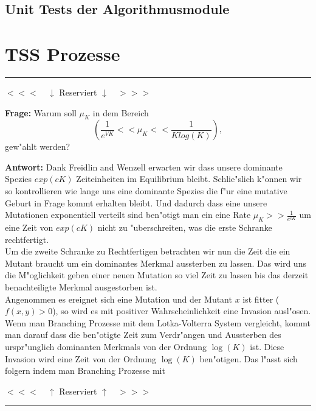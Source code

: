 \documentclass[11pt, a4paper, german]{article}
\begin{document}
	\subsection{Unit Tests der Algorithmusmodule}

\clearpage
\section{TSS Prozesse}
\noindent\rule{\textwidth}{2pt}
\begin{center}
	$ <<< \quad \downarrow $ Reserviert $ \downarrow \quad >>> $
\end{center}
\begin{center}
	\textbf{Frage:} Warum soll $ \mu_K $ in dem Bereich 
	\[ \left( \frac{1}{e^{VK}} << \mu_K << \frac{1}{K log(K)} \right), \] 
	gew"ahlt werden?\\
\end{center}

\textbf{Antwort:} Dank Freidlin and Wenzell \cite{freidlin2012random} erwarten wir dass unsere dominante Spezies $ exp(cK) $ Zeiteinheiten im Equilibrium bleibt. Schlie"slich k"onnen wir so kontrollieren wie lange uns eine dominante Spezies die f"ur eine mutative Geburt in Frage kommt erhalten bleibt. Und dadurch dass eine unsere Mutationen exponentiell verteilt sind ben"otigt man ein eine Rate $ \mu_K >> \frac{1}{e^{cK}} $ um eine Zeit von $ exp(cK) $ nicht zu "uberschreiten, was die erste Schranke rechtfertigt.\\
Um die zweite Schranke zu Rechtfertigen betrachten wir nun die Zeit die ein Mutant braucht um ein dominantes Merkmal aussterben zu lassen. Das wird uns die M"oglichkeit geben einer neuen Mutation so viel Zeit zu lassen bis das derzeit benachteiligte Merkmal ausgestorben ist.\\
Angenommen es ereignet sich eine Mutation und der Mutant $ x $ ist fitter ($ f(x,y) > 0 $), so wird es mit positiver Wahrscheinlichkeit eine Invasion ausl"osen. Wenn man Branching Prozesse mit dem Lotka-Volterra System vergleicht, kommt man darauf dass die ben"otigte Zeit zum Verdr"angen und Aussterben des urspr"unglich dominanten Merkmals von der Ordnung $ \log(K) $ ist.
Diese Invasion wird eine Zeit von der Ordnung $ \log(K) $ ben"otigen. Das l"asst sich folgern indem man Branching Prozesse mit 

\begin{center}
	$ <<< \quad \uparrow $ Reserviert $ \uparrow \quad >>> $
\end{center}
\noindent\rule{\textwidth}{2pt}
\end{document}
